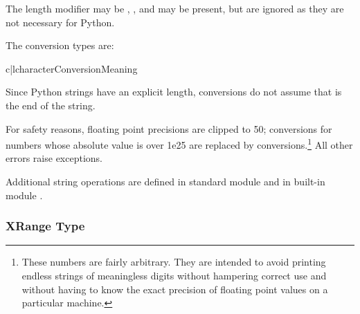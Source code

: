 The length modifier may be , , and  may be
present, but are ignored as they are not necessary for Python.

The conversion types are:

\begin{tableii}{c|l}{character}{Conversion}{Meaning}
\end{tableii}



Since Python strings have an explicit length,  conversions
do not assume that  is the end of the string.

For safety reasons, floating point precisions are clipped to 50;
 conversions for numbers whose absolute value is over 1e25
are replaced by  conversions.\footnote{
  These numbers are fairly arbitrary.  They are intended to
  avoid printing endless strings of meaningless digits without hampering
  correct use and without having to know the exact precision of floating
  point values on a particular machine.
}  All other errors raise exceptions.

Additional string operations are defined in standard module
 and in built-in module .


\subsubsection{XRange Type \label{typesseq-xrange}}


